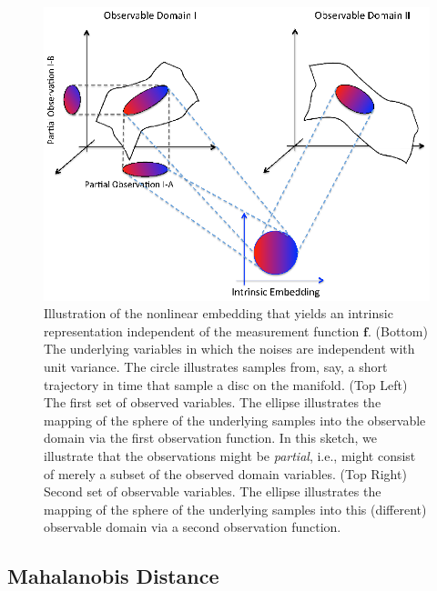 \begin{figure}[t]
\includegraphics[width=5in]{fig1}
\caption[Illustration of the nonlinear embedding that yields an intrinsic representation independent of the measurement function]{Illustration of the nonlinear embedding that yields an intrinsic representation independent of the measurement function $\mathbf{f}$. (Bottom) The underlying variables in which the noises are independent with unit variance. The circle illustrates samples from, say, a short trajectory in time that sample a disc on the manifold. (Top Left) The first set of observed variables. The ellipse illustrates the mapping of the sphere of the underlying samples into the observable domain via the first observation function. In this sketch, we illustrate that the observations might be {\em partial}, i.e., might consist of merely a subset of the observed domain variables. (Top Right) Second set of observable variables. The ellipse illustrates the mapping of the sphere of the underlying samples into this (different) observable domain via a second observation function.
\label{fig:IntrinsicIllustration}}
\end{figure}

\subsection{Mahalanobis Distance}
\label{subsec:mahalanobis}

